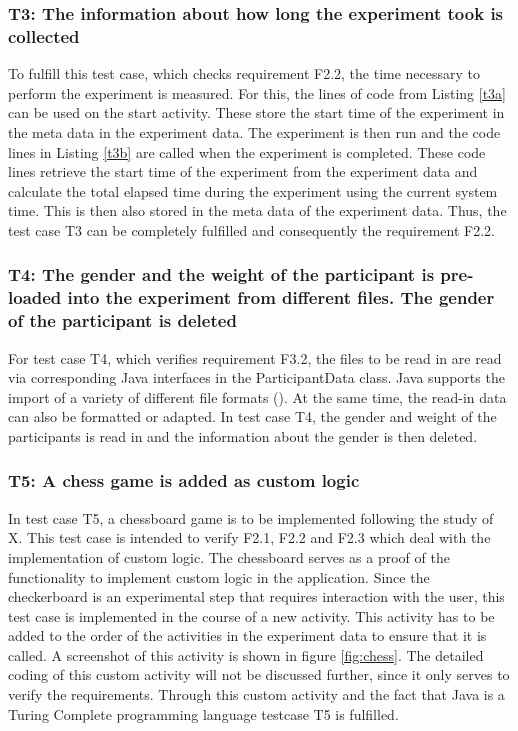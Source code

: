 \subsubsection*{T3: The information about how long the experiment took is collected}

To fulfill this test case, which checks requirement F2.2, the time necessary to perform the experiment is measured. For this, the lines of code from Listing \ref{t3a} can be used on the start activity. These store the start time of the experiment in the meta data in the experiment data. The experiment is then run and the code lines in Listing \ref{t3b} are called when the experiment is completed. These code lines retrieve the start time of the experiment from the experiment data and calculate the total elapsed time during the experiment using the current system time. This is then also stored in the meta data of the experiment data. Thus, the test case T3 can be completely fulfilled and consequently the requirement F2.2.

\subsubsection*{T4: The gender and the weight of the participant is pre-loaded into the experiment from different files. The gender of the participant is deleted}

For test case T4, which verifies requirement F3.2, the files to be read in are read via corresponding Java interfaces in the ParticipantData class. Java supports the import of a variety of different file formats (\cite{Ullenboom.2017}). At the same time, the read-in data can also be formatted or adapted. In test case T4, the gender and weight of the participants is read in and the information about the gender is then deleted.

\subsubsection*{T5: A chess game is added as custom logic}

In test case T5, a chessboard game is to be implemented following the study of X. This test case is intended to verify F2.1, F2.2 and F2.3 which deal with the implementation of custom logic. The chessboard serves as a proof of the functionality to implement custom logic in the application. Since the checkerboard is an experimental step that requires interaction with the user, this test case is implemented in the course of a new activity. This activity has to be added to the order of the activities in the experiment data to ensure that it is called. A screenshot of this activity is shown in figure \ref{fig:chess}. The detailed coding of this custom activity will not be discussed further, since it only serves to verify the requirements. Through this custom activity and the fact that Java is a Turing Complete programming language testcase T5 is fulfilled.

